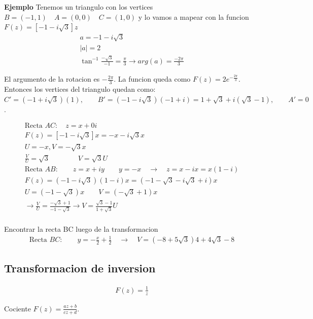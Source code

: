 \documentclass{article}
\newcommand{\caja}[3]{%
  \begin{tcolorbox}[colback=#1!5!white,colframe=#1!25!black,title=#2]
    #3
  \end{tcolorbox}%
}
\begin{document}
\textbf{Ejemplo } Tenemos un triangulo con los vertices $ B = (-1,1) \quad A = (0,0) \quad C = (1,0) $ y lo vamos a mapear con la funcion $ F\left(z\right)= [-1 -i \sqrt{3} ]z $
\begin{gather}
  a = -1-i \sqrt{3 } \\
  \left|a \right| = 2 \\
  \tan^{-1}{\frac{-\sqrt{3} }{-1 }} = \frac{\pi}{3} \rightarrow arg(a) = \frac{-2\pi}{3}
\end{gather}

El argumento de la rotacion es $ -\frac{2\pi}{3} $. La funcion queda como $ F\left(z\right)=2e ^ {-\frac{2\pi}{3}} $. Entonces los vertices del triangulo quedan como: $ C' = (-1+i \sqrt{3 } )(1), \qquad B' = (-1-i \sqrt{3 } )(-1+i) = 1+ \sqrt{3} + i(\sqrt{3} -1) , \qquad A' = 0$. 

\begin{gather}
  \text{Recta }AC: \quad z = x+0i\\
  F\left(z\right)=[-1-i \sqrt{3 } ]x  = -x-i \sqrt{3 } x \\
  U = -x, V = -\sqrt{3 } x\\
  \frac{V}{U} = \sqrt{3} \qquad \qquad V = \sqrt{3} U\\
  \text{Recta }AB: \qquad z = x+iy \qquad y = -x \quad \rightarrow \quad z = x-ix = x(1-i)\\
  F\left(z\right)=(-1-i \sqrt{3 } )(1-i ) x = (-1- \sqrt{3} -i \sqrt{3} +i)x\\
  U =(-1- \sqrt{3 } )x \qquad V = (-\sqrt{3 } +1 )x \\
  \rightarrow \frac{V}{U} = \frac{-\sqrt{3 } +1 }{-1-\sqrt{3 } } \rightarrow V = \frac{\sqrt{3} -1 }{1+\sqrt{3} }U\\
\end{gather}
\caja{blue}{Tarea }{
  Encontrar la recta BC luego de la transformacion
  \tcblower
  \begin{gather*}
    \text{Recta }BC: \qquad y = -\frac{x}{2}+\frac{1}{2} \quad \rightarrow \quad V = (-8 +5 \sqrt{3 } )4 + 4 \sqrt{3 } -8
    \label{eq:null}
  \end{gather*}
}

\subsection{Transformacion de inversion}
\caja{green}{Inversion }{
  \begin{gather}
    F\left(z\right)=\frac{1}{z} 
    \label{eq:inversion }
  \end{gather}
}
Cociente $ F\left(z\right)=\frac{az+b }{cz+d } $. 
\end{document}
